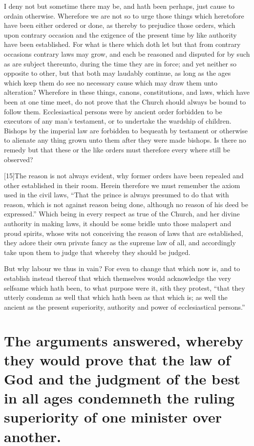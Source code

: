 I deny not but sometime there may be, and hath been perhaps, just cause to ordain otherwise. Wherefore we are not so to urge those things which heretofore have been either ordered or done, as thereby to prejudice those orders, which upon contrary occasion and the exigence of the present time by like authority have been established. For what is there which doth let but that from contrary occasions contrary laws may grow, and each be reasoned and disputed for by such as are subject thereunto, during the time they are in force; and yet neither so opposite to other, but that both may laudably continue, as long as the ages which keep them do see no  necessary cause which may draw them unto alteration? Wherefore in these things, canons, constitutions, and laws, which have been at one time meet, do not prove that the Church should always be bound to follow them. Ecclesiastical persons were by ancient order forbidden to be executors of any man’s testament, or to undertake the wardship of children. Bishops by the imperial law are forbidden to bequeath by testament or otherwise to alienate any thing grown unto them after they were made bishops. Is there no remedy but that these or the like orders must therefore every where still be observed?

[15]The reason is not always evident, why former orders have been repealed and other established in their room. Herein therefore we must remember the axiom used in the civil laws, “That the prince is always presumed to do that with reason, which is not against reason being done, although no reason of his deed be expressed.” Which being in every respect as true of the Church, and her divine authority in making laws, it should be some bridle unto those malapert and proud spirits, whose wits not conceiving the reason of laws that are established, they adore their own private fancy as the supreme law of all, and accordingly take upon them to judge that whereby they should be judged.

But why labour we thus in vain? For even to change that which now is, and to establish instead thereof that which themselves would acknowledge the very selfsame which hath been, to what purpose were it, sith they protest, “that  they utterly condemn as well that which hath been as that which is; as well the ancient as the present superiority, authority and power of ecclesiastical persons.”

\section*{The arguments answered, whereby they would prove that the law of God and the judgment of the best in all ages condemneth the ruling superiority of one minister over another.}

